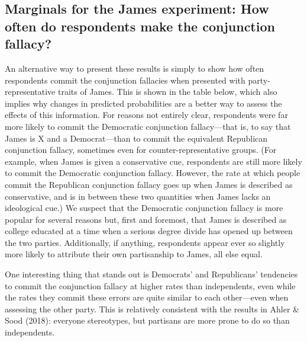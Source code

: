 \documentclass[12pt, letterpaper]{article}
\begin{document}



\clearpage
\subsection{Marginals for the James experiment: How often do respondents make the conjunction fallacy?} \label{si:marginals}

An alternative way to present these results is simply to show how often respondents commit the conjunction fallacies when presented with party-representative traits of James. This is shown in the table below, which also implies why changes in predicted probabilities are a better way to assess the effects of this information. For reasons not entirely clear, respondents were far more likely to commit the Democratic conjunction fallacy---that is, to say that James is X and a Democrat---than to commit the equivalent Republican conjunction fallacy, sometimes even for counter-representative groups. (For example, when James is given a conservative cue, respondents are still more likely to commit the Democratic conjunction fallacy. However, the rate at which people commit the Republican conjunction fallacy goes up when James is described as conservative, and is in between these two quantities when James lacks an ideological cue.) We suspect that the Democratic conjunction fallacy is more popular for several reasons but, first and foremost, that James is described as college educated at a time when a serious degree divide has opened up between the two parties. Additionally, if anything, respondents appear ever so slightly more likely to attribute their own partisanship to James, all else equal.

One interesting thing that stands out is Democrats' and Republicans' tendencies to commit the conjunction fallacy at higher rates than independents, even while the rates they commit these errors are quite similar to each other---even when assessing the other party. This is relatively consistent with the results in Ahler \& Sood (2018): everyone stereotypes, but partisans are more prone to do so than independents.

\end{document}
